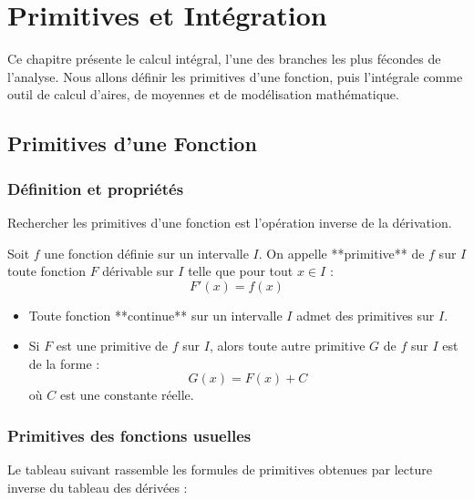 \chapter{Primitives et Intégration}

Ce chapitre présente le calcul intégral, l'une des branches les plus fécondes de l'analyse. Nous allons définir les primitives d'une fonction, puis l'intégrale comme outil de calcul d'aires, de moyennes et de modélisation mathématique.

\section{Primitives d'une Fonction}

\subsection{Définition et propriétés}

Rechercher les primitives d'une fonction est l'opération inverse de la dérivation.

\begin{definition}[Primitive]
Soit $f$ une fonction définie sur un intervalle $I$.
On appelle **primitive** de $f$ sur $I$ toute fonction $F$ dérivable sur $I$ telle que pour tout $x \in I$ :
\[
F'(x) = f(x)
\]
\end{definition}

\begin{theoreme}
\begin{itemize}
    \item Toute fonction **continue** sur un intervalle $I$ admet des primitives sur $I$.
    \item Si $F$ est une primitive de $f$ sur $I$, alors toute autre primitive $G$ de $f$ sur $I$ est de la forme :
    \[
    G(x) = F(x) + C
    \]
    où $C$ est une constante réelle.
\end{itemize}
\end{theoreme}

\subsection{Primitives des fonctions usuelles}

Le tableau suivant rassemble les formules de primitives obtenues par lecture inverse du tableau des dérivées :

